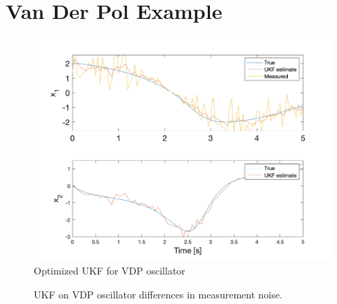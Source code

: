 \section{Van Der Pol Example}
\label{Van Der Pol Example}




\begin{figure}[h]
    \centering
    \includegraphics[scale = 0.6]{VDP.png}
    \caption{Optimized UKF for VDP oscillator}
    \label{map}
\end{figure}

\begin{figure}[!tbp]
  \centering
  \hfill
  \caption{UKF on VDP oscillator differences in measurement noise.}
\end{figure}


